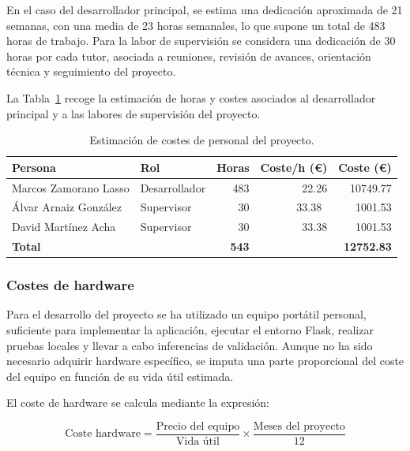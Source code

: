 En el caso del desarrollador principal, se estima una dedicación aproximada de \num{21} semanas, con una media de \num{23} horas semanales, lo que supone un total de \num{483} horas de trabajo. Para la labor de supervisión se considera una dedicación de \num{30} horas por cada tutor, asociada a reuniones, revisión de avances, orientación técnica y seguimiento del proyecto.

La Tabla~\ref{tab:costes_personal} recoge la estimación de horas y costes asociados al desarrollador principal y a las labores de supervisión del proyecto.

\begin{table}[]
	\centering
	\small
	\renewcommand{\arraystretch}{1.25}
	\setlength{\tabcolsep}{5pt}
	\begin{tabular}{p{4.0cm} p{2.8cm} r r r}
		\toprule
		\textbf{Persona} & \textbf{Rol} & \textbf{Horas} & \textbf{Coste/h (€)} & \textbf{Coste (€)} \\
		\midrule
		Marcos Zamorano Lasso & Desarrollador & \num{483} & \num{22.26} & \num{10749.77} \\
		Álvar Arnaiz González & Supervisor & \num{30} & \num{33.38}\ & \num{1001.53} \\
		David Martínez Acha & Supervisor & \num{30} & \num{33.38} & \num{1001.53} \\
		\midrule
		\textbf{Total} & & \textbf{\num{543}} & & \textbf{\num{12752.83}} \\
		\bottomrule
	\end{tabular}
	\caption{Estimación de costes de personal del proyecto.}
	\label{tab:costes_personal}
\end{table}


\subsubsection{Costes de hardware}

Para el desarrollo del proyecto se ha utilizado un equipo portátil personal, suficiente para implementar la aplicación, ejecutar el entorno Flask, realizar pruebas locales y llevar a cabo inferencias de validación. Aunque no ha sido necesario adquirir hardware específico, se imputa una parte proporcional del coste del equipo en función de su vida útil estimada.

El coste de hardware se calcula mediante la expresión:

\begin{equation}
	\text{Coste hardware} =
	\frac{\text{Precio del equipo}}{\text{Vida útil}} \times
	\frac{\text{Meses del proyecto}}{\num{12}}
\end{equation}

